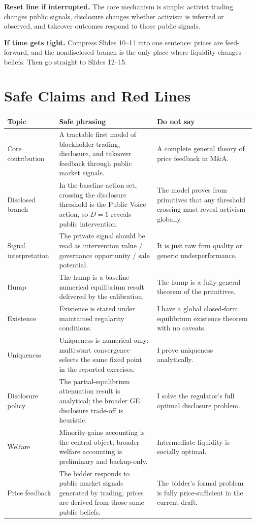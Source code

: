 \documentclass[9pt,a4paper]{extarticle}
\newcommand{\avoid}[1]{\textcolor{ptrose}{#1}}
\newcommand{\safe}[1]{\textcolor{ptgreen!60!black}{#1}}
\begin{document}
\textbf{Reset line if interrupted.}
The core mechanism is simple: activist trading changes public signals, disclosure changes whether activism is inferred or observed, and takeover outcomes respond to those public signals.

\textbf{If time gets tight.}
Compress Slides 10--11 into one sentence: prices are feed-forward, and the nondisclosed branch is the only place where liquidity changes beliefs. Then go straight to Slides 12--15.

\section{Safe Claims and Red Lines}

{\footnotesize
\begin{tabularx}{\textwidth}{@{}P{0.23\textwidth}P{0.38\textwidth}Y@{}}
\toprule
\textbf{Topic} & \textbf{Safe phrasing} & \textbf{Do not say} \\
\midrule
Core contribution & \safe{A tractable first model of blockholder trading, disclosure, and takeover feedback through public market signals.} & \avoid{A complete general theory of price feedback in M\&A.} \\
Disclosed branch & \safe{In the baseline action set, crossing the disclosure threshold is the Public Voice action, so $D=1$ reveals public intervention.} & \avoid{The model proves from primitives that any threshold crossing must reveal activism globally.} \\
Signal interpretation & \safe{The private signal should be read as intervention value / governance opportunity / sale potential.} & \avoid{It is just raw firm quality or generic underperformance.} \\
Hump & \safe{The hump is a baseline numerical equilibrium result delivered by the calibration.} & \avoid{The hump is a fully general theorem of the primitives.} \\
Existence & \safe{Existence is stated under maintained regularity conditions.} & \avoid{I have a global closed-form equilibrium existence theorem with no caveats.} \\
Uniqueness & \safe{Uniqueness is numerical only: multi-start convergence selects the same fixed point in the reported exercises.} & \avoid{I prove uniqueness analytically.} \\
Disclosure policy & \safe{The partial-equilibrium attenuation result is analytical; the broader GE disclosure trade-off is heuristic.} & \avoid{I solve the regulator's full optimal disclosure problem.} \\
Welfare & \safe{Minority-gains accounting is the central object; broader welfare accounting is preliminary and backup-only.} & \avoid{Intermediate liquidity is socially optimal.} \\
Price feedback & \safe{The bidder responds to public market signals generated by trading; prices are derived from those same public beliefs.} & \avoid{The bidder's formal problem is fully price-sufficient in the current draft.} \\
\bottomrule
\end{tabularx}
}
\end{document}
